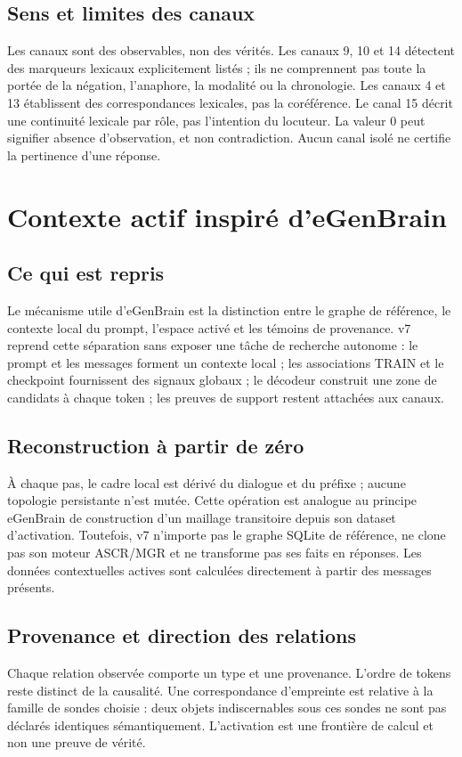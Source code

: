 \documentclass[11pt,a4paper]{report}
\begin{document}
\section{Sens et limites des canaux}
Les canaux sont des observables, non des vérités. Les canaux 9, 10 et 14 détectent des marqueurs lexicaux explicitement listés ; ils ne comprennent pas toute la portée de la négation, l'anaphore, la modalité ou la chronologie. Les canaux 4 et 13 établissent des correspondances lexicales, pas la coréférence. Le canal 15 décrit une continuité lexicale par rôle, pas l'intention du locuteur. La valeur 0 peut signifier absence d'observation, et non contradiction. Aucun canal isolé ne certifie la pertinence d'une réponse.

\chapter{Contexte actif inspiré d'eGenBrain}
\section{Ce qui est repris}
Le mécanisme utile d'eGenBrain est la distinction entre le graphe de référence, le contexte local du prompt, l'espace activé et les témoins de provenance. v7 reprend cette séparation sans exposer une tâche de recherche autonome : le prompt et les messages forment un contexte local ; les associations TRAIN et le checkpoint fournissent des signaux globaux ; le décodeur construit une zone de candidats à chaque token ; les preuves de support restent attachées aux canaux.

\section{Reconstruction à partir de zéro}
À chaque pas, le cadre local est dérivé du dialogue et du préfixe ; aucune topologie persistante n'est mutée. Cette opération est analogue au principe eGenBrain de construction d'un maillage transitoire depuis son dataset d'activation. Toutefois, v7 n'importe pas le graphe SQLite de référence, ne clone pas son moteur ASCR/MGR et ne transforme pas ses faits en réponses. Les données contextuelles actives sont calculées directement à partir des messages présents.

\section{Provenance et direction des relations}
Chaque relation observée comporte un type et une provenance. L'ordre de tokens reste distinct de la causalité. Une correspondance d'empreinte est relative à la famille de sondes choisie : deux objets indiscernables sous ces sondes ne sont pas déclarés identiques sémantiquement. L'activation est une frontière de calcul et non une preuve de vérité.
\end{document}
